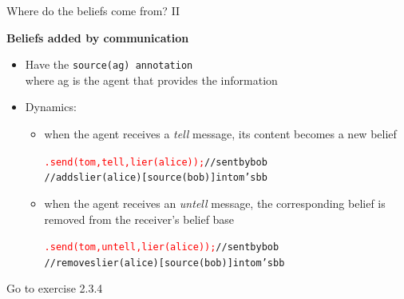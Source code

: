 \documentclass[compress]{beamer}
\newcommand{\instruction}[1]{\textcolor{red}{#1}}
\newcommand{\comment}[1]{\textcolor{harvestgold}{#1}}
\begin{document}
\begin{frame}{Where do the beliefs come from? II}
%
 
 {\bf Beliefs added by communication}
 \vspace{.5cm}
 \begin{itemize}
  \item Have the \texttt{source(ag) annotation}\\
  {\tiny where ag is the agent that provides the information}
  \item Dynamics: 
   
   \begin{itemize}\footnotesize
     \item when the agent receives a \textit{tell} message, its content becomes a new belief\\
     \begin{alltt}
       \instruction{.send(tom,tell,lier(alice));}\comment{//sent by bob}\\      
       \comment{//adds lier(alice)[source(bob)] in tom's bb}
     \end{alltt}
     
     \vspace{.8em}
     
     \item when the agent receives an \textit{untell} message, the corresponding belief is removed from the receiver's belief base\\
     \begin{alltt}
       \instruction{.send(tom,untell,lier(alice));}\comment{//sent by bob}\\
        \comment{//removes lier(alice)[source(bob)] in tom's bb}
     \end{alltt}
    \end{itemize} 
  \end{itemize}
 \vfill
 {\tiny Go to exercise 2.3.4}
\end{frame}
\end{document}
